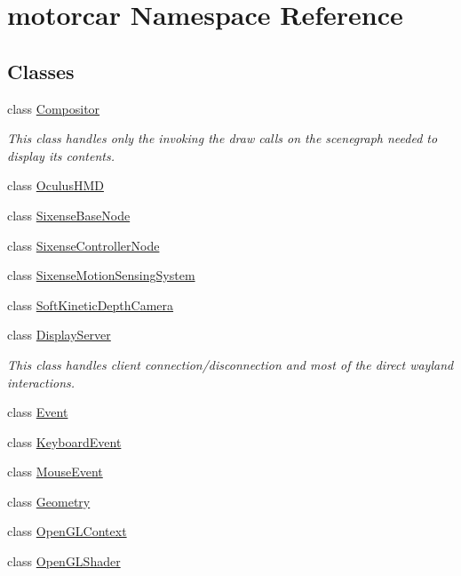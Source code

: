\hypertarget{namespacemotorcar}{\section{motorcar Namespace Reference}
\label{namespacemotorcar}
}
\subsection*{Classes}
\begin{DoxyCompactItemize}
\item 
class \hyperlink{classmotorcar_1_1Compositor}{Compositor}
\begin{DoxyCompactList}\small\item\em This class handles only the invoking the draw calls on the scenegraph needed to display its contents. \end{DoxyCompactList}\item 
class \hyperlink{classmotorcar_1_1OculusHMD}{Oculus\-H\-M\-D}
\item 
class \hyperlink{classmotorcar_1_1SixenseBaseNode}{Sixense\-Base\-Node}
\item 
class \hyperlink{classmotorcar_1_1SixenseControllerNode}{Sixense\-Controller\-Node}
\item 
class \hyperlink{classmotorcar_1_1SixenseMotionSensingSystem}{Sixense\-Motion\-Sensing\-System}
\item 
class \hyperlink{classmotorcar_1_1SoftKineticDepthCamera}{Soft\-Kinetic\-Depth\-Camera}
\item 
class \hyperlink{classmotorcar_1_1DisplayServer}{Display\-Server}
\begin{DoxyCompactList}\small\item\em This class handles client connection/disconnection and most of the direct wayland interactions. \end{DoxyCompactList}\item 
class \hyperlink{classmotorcar_1_1Event}{Event}
\item 
class \hyperlink{classmotorcar_1_1KeyboardEvent}{Keyboard\-Event}
\item 
class \hyperlink{classmotorcar_1_1MouseEvent}{Mouse\-Event}
\item 
class \hyperlink{classmotorcar_1_1Geometry}{Geometry}
\item 
class \hyperlink{classmotorcar_1_1OpenGLContext}{Open\-G\-L\-Context}
\item 
class \hyperlink{classmotorcar_1_1OpenGLShader}{Open\-G\-L\-Shader}
\item 

\end{DoxyCompactItemize}
